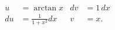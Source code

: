 \documentclass{article}
\begin{document}
\begin{align}
u &= \arctan x & dv &= 1 \, dx \\
 du &= \frac{1}{1 + x^2} dx & v &= x. \label{eq:aaa}
\end{align}
\end{document}

